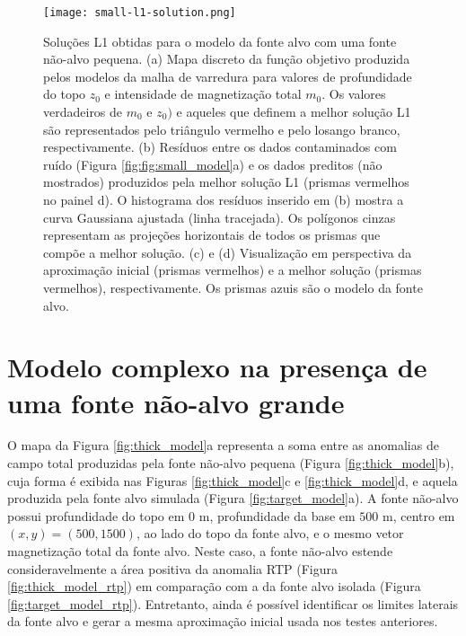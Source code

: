 \pagebreak
\begin{figure}[!htb]
	\centering
	\texttt{[image: small-l1-solution.png]}
	\caption{Soluções L1 obtidas para o modelo da fonte alvo com uma fonte não-alvo pequena. 
		(a) Mapa discreto da função objetivo produzida pelos modelos da malha de varredura para valores de profundidade do topo $z_{0}$ e intensidade de magnetização total $m_{0}$. 
		Os valores verdadeiros de $m_{0}$ e $z_{0})$ e aqueles que definem a melhor solução L1 são representados pelo triângulo vermelho e pelo losango branco, respectivamente.
		(b) Resíduos entre os dados contaminados com ruído (Figura \ref{fig:fig:small_model}a) 
		e os dados preditos (não mostrados) produzidos pela melhor solução L1 (prismas vermelhos no painel d). 
		O histograma dos resíduos inserido em (b) mostra a curva Gaussiana ajustada (linha tracejada).
		Os polígonos cinzas representam as projeções horizontais de todos os prismas que compõe a melhor solução. 
		(c) e (d) Visualização em perspectiva da aproximação inicial (prismas vermelhos) e 
		a melhor solução (prismas vermelhos), respectivamente. Os prismas azuis são o modelo da fonte alvo. 
	}
	\label{fig:small_l1_result}
\end{figure}
\pagebreak
\section{Modelo complexo na presença de uma fonte não-alvo grande}
\label{sec:target_source_with_large_interference}

O mapa da Figura \ref{fig:thick_model}a representa a soma entre as anomalias de campo total produzidas pela fonte não-alvo pequena (Figura \ref{fig:thick_model}b), cuja forma é exibida nas Figuras \ref{fig:thick_model}c e \ref{fig:thick_model}d, e aquela produzida pela fonte alvo simulada (Figura \ref{fig:target_model}a).
A fonte não-alvo possui profundidade do topo em $0$ m, profundidade da base em $500$ m, 
centro em $(x, y) = (500, 1500)$, ao lado do topo da fonte alvo, e o mesmo vetor magnetização total da fonte alvo.
Neste caso, a fonte não-alvo estende consideravelmente a área positiva da anomalia RTP (Figura \ref{fig:thick_model_rtp}) em comparação com a da fonte alvo isolada (Figura \ref{fig:target_model_rtp}). Entretanto, ainda é possível identificar os limites laterais da fonte alvo e gerar a mesma aproximação inicial usada nos testes anteriores.



